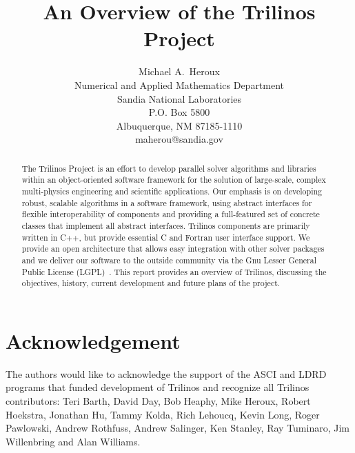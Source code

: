 \documentclass[12pt,relax]{SANDreport}
\title{An Overview of the Trilinos Project}
\author{Michael A.~Heroux\\
       Numerical and Applied Mathematics Department \\
	  Sandia National Laboratories\\
	  P.O. Box 5800\\
	  Albuquerque, NM 87185-1110 \\
	  maherou@sandia.gov \\
	 }
\date{}
\begin{document}
    \maketitle

    \begin{abstract}
The Trilinos Project is an effort to develop parallel solver algorithms and libraries 
within 
an object-oriented software framework for the solution of large-scale, complex
multi-physics engineering and scientific applications.   Our emphasis is on 
developing robust, scalable algorithms in a software framework, using abstract 
interfaces for flexible interoperability of components and providing a 
full-featured set of concrete classes that implement all abstract interfaces. 
Trilinos components are primarily written in C++, but provide essential C and 
Fortran user interface support.  We provide an open architecture that allows 
easy integration with other solver packages and we deliver our software to 
the outside community via the Gnu Lesser General Public License
(LGPL)~\cite{gnu-license-site}.
This report provides an overview of Trilinos, discussing the objectives, history,
current development and future plans of the project.
    \end{abstract}


    \clearpage
    \section*{Acknowledgement}
The authors would like to acknowledge the support of the ASCI and LDRD programs
that funded development of Trilinos and recognize all Trilinos contributors: 
Teri Barth, David Day, Bob Heaphy, Mike Heroux, Robert Hoekstra, Jonathan Hu, 
Tammy Kolda, Rich Lehoucq,
Kevin Long, Roger Pawlowski, Andrew Rothfuss, Andrew Salinger, Ken Stanley, Ray Tuminaro,
Jim Willenbring and Alan Williams.
\end{document}
